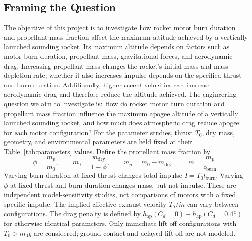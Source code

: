 \documentclass{article}
\begin{document}
\subsection{Framing the Question}
The objective of this project is to investigate how rocket motor burn duration and propellant mass fraction affect the maximum altitude achieved by a vertically launched sounding rocket. Its maximum altitude depends on factors such as motor burn duration, propellant mass, gravitational forces, and aerodynamic drag. Increasing propellant mass changes the rocket's initial mass and mass depletion rate; whether it also increases impulse depends on the specified thrust and burn duration. Additionally, higher ascent velocities can increase aerodynamic drag and therefore reduce the altitude achieved. The engineering question we aim to investigate is: How do rocket motor burn duration and propellant mass fraction influence the maximum apogee altitude of a vertically launched sounding rocket, and how much does atmospheric drag reduce apogee for each motor configuration?
For the parameter studies, thrust $T_0$, dry mass, geometry, and environmental parameters are held fixed at their Table~\ref{tab:parameters} values. Define the propellant mass fraction by
\[
\phi=\frac{m_p}{m_0},\qquad m_0=\frac{m_{\mathrm{dry}}}{1-\phi},\qquad
m_p=m_0-m_{\mathrm{dry}},\qquad \dot m=\frac{m_p}{t_{\mathrm{burn}}}.
\]
Varying burn duration at fixed thrust changes total impulse $I=T_0t_{\mathrm{burn}}$. Varying $\phi$ at fixed thrust and burn duration changes mass, but not impulse. These are independent model-sensitivity studies, not comparisons of motors with a fixed specific impulse. The implied effective exhaust velocity $T_0/\dot m$ can vary between configurations. The drag penalty is defined by $h_{\mathrm{ap}}(C_d=0)-h_{\mathrm{ap}}(C_d=0.45)$ for otherwise identical parameters. Only immediate-lift-off configurations with $T_0>m_0g$ are considered; ground contact and delayed lift-off are not modeled.
\end{document}
